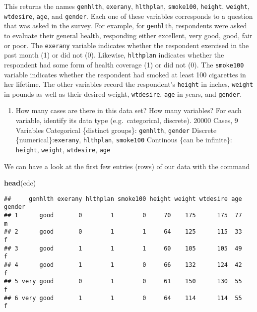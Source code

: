 \documentclass[]{article}
\newenvironment{Shaded}{\begin{snugshade}}{\end{snugshade}}
\newcommand{\KeywordTok}[1]{\textcolor[rgb]{0.13,0.29,0.53}{\textbf{#1}}}
\newcommand{\NormalTok}[1]{#1}
\providecommand{\tightlist}{%
  \setlength{\itemsep}{0pt}\setlength{\parskip}{0pt}}
\begin{document}
This returns the names \texttt{genhlth}, \texttt{exerany},
\texttt{hlthplan}, \texttt{smoke100}, \texttt{height}, \texttt{weight},
\texttt{wtdesire}, \texttt{age}, and \texttt{gender}. Each one of these
variables corresponds to a question that was asked in the survey. For
example, for \texttt{genhlth}, respondents were asked to evaluate their
general health, responding either excellent, very good, good, fair or
poor. The \texttt{exerany} variable indicates whether the respondent
exercised in the past month (1) or did not (0). Likewise,
\texttt{hlthplan} indicates whether the respondent had some form of
health coverage (1) or did not (0). The \texttt{smoke100} variable
indicates whether the respondent had smoked at least 100 cigarettes in
her lifetime. The other variables record the respondent's
\texttt{height} in inches, \texttt{weight} in pounds as well as their
desired weight, \texttt{wtdesire}, \texttt{age} in years, and
\texttt{gender}.

\begin{enumerate}
\def\labelenumi{\arabic{enumi}.}
\tightlist
\item
  How many cases are there in this data set? How many variables? For
  each variable, identify its data type (e.g.~categorical, discrete).
  20000 Cases, 9 Variables Categorical \{distinct groups\}:
  \texttt{genhlth}, \texttt{gender} Discrete
  \{numerical\}:\texttt{exerany}, \texttt{hlthplan}, \texttt{smoke100}
  Continous \{can be infinite\}: \texttt{height}, \texttt{weight},
  \texttt{wtdesire}, \texttt{age}
\end{enumerate}

We can have a look at the first few entries (rows) of our data with the
command

\begin{Shaded}
\begin{Highlighting}[]
\KeywordTok{head}\NormalTok{(cdc)}
\end{Highlighting}
\end{Shaded}

\begin{verbatim}
##     genhlth exerany hlthplan smoke100 height weight wtdesire age gender
## 1      good       0        1        0     70    175      175  77      m
## 2      good       0        1        1     64    125      115  33      f
## 3      good       1        1        1     60    105      105  49      f
## 4      good       1        1        0     66    132      124  42      f
## 5 very good       0        1        0     61    150      130  55      f
## 6 very good       1        1        0     64    114      114  55      f
\end{verbatim}
\end{document}
